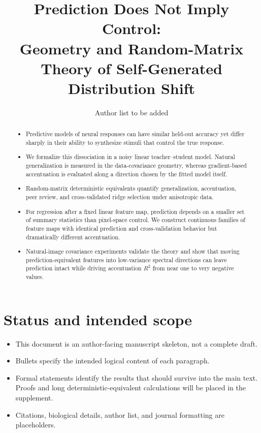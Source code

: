 \documentclass[11pt]{article}
\title{Prediction Does Not Imply Control:\\
Geometry and Random-Matrix Theory of Self-Generated Distribution Shift}
\author{Author list to be added}
\date{}
\begin{document}
\maketitle

\begin{abstract}
\begin{itemize}[leftmargin=1.5em]
  \item Predictive models of neural responses can have similar held-out
        accuracy yet differ sharply in their ability to synthesize stimuli
        that control the true response.
  \item We formalize this dissociation in a noisy linear teacher--student
        model. Natural generalization is measured in the data-covariance
        geometry, whereas gradient-based accentuation is evaluated along a
        direction chosen by the fitted model itself.
  \item Random-matrix deterministic equivalents quantify generalization,
        accentuation, peer review, and cross-validated ridge selection under
        anisotropic data.
  \item For regression after a fixed linear feature map, prediction depends
        on a smaller set of summary statistics than pixel-space control. We
        construct continuous families of feature maps with identical
        prediction and cross-validation behavior but dramatically different
        accentuation.
  \item Natural-image covariance experiments validate the theory and show
        that moving prediction-equivalent features into low-variance spectral
        directions can leave prediction intact while driving accentuation
        $R^2$ from near one to very negative values.
\end{itemize}
\end{abstract}

\section*{Status and intended scope}

\begin{itemize}
  \item This document is an author-facing manuscript skeleton, not a complete
        draft.
  \item Bullets specify the intended logical content of each paragraph.
  \item Formal statements identify the results that should survive into the
        main text. Proofs and long deterministic-equivalent calculations will
        be placed in the supplement.
  \item Citations, biological details, author list, and journal formatting are
        placeholders.
\end{itemize}
\end{document}
